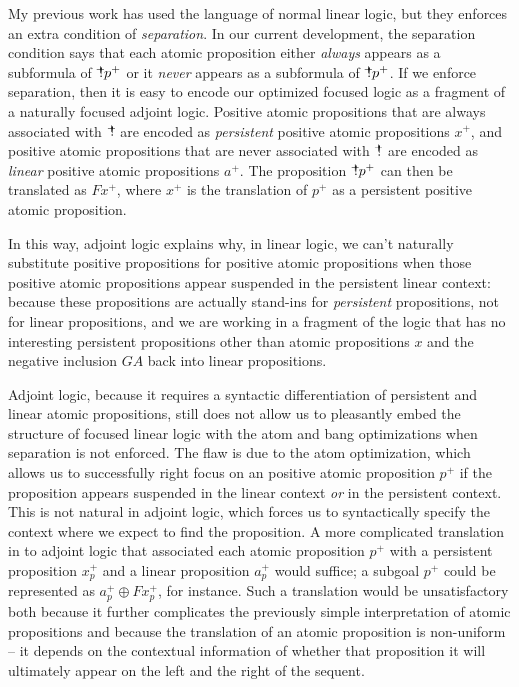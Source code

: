 My previous work has used the language of normal linear logic,
but they enforces an extra condition of {\it separation}. In our
current development, the separation condition says that each atomic
proposition either {\it always} appears as a subformula of
${\mbox{\hspace{2pt}$\mathbb !$\hspace{-5pt}$^+$\hspace{-1pt}}}p^+$ or it {\it never} appears as a subformula of
${\mbox{\hspace{2pt}$\mathbb !$\hspace{-5pt}$^+$\hspace{-1pt}}}p^+$. If we enforce separation, then it is easy to encode our
optimized focused logic as a fragment of a naturally focused adjoint
logic. Positive atomic propositions that are always associated with
${\mbox{\hspace{2pt}$\mathbb !$\hspace{-5pt}$^+$\hspace{-1pt}}}$ are encoded as {\it persistent} positive atomic
propositions $x^+$, and positive atomic propositions that are never
associated with ${\mbox{\hspace{2pt}$\mathbb !$\hspace{-5pt}$^+$\hspace{-1pt}}}$ are encoded as {\it linear} positive atomic
propositions $a^+$. The proposition ${\mbox{\hspace{2pt}$\mathbb !$\hspace{-5pt}$^+$\hspace{-1pt}}}p^+$ can then be
translated as $F x^+$, where $x^+$ is the translation of $p^+$ as a
persistent positive atomic proposition.

In this way, adjoint logic explains why, in linear logic, we can't
naturally substitute positive propositions for positive atomic
propositions when those positive atomic propositions appear suspended
in the persistent linear context: because these propositions are
actually stand-ins for {\it persistent} propositions, not for linear
propositions, and we are working in a fragment of the logic that has
no interesting persistent propositions other than atomic propositions
$x$ and the negative inclusion $G A$ back into linear propositions.

Adjoint logic, because it requires a syntactic differentiation of
persistent and linear atomic propositions, still does not allow us to
pleasantly embed the structure of focused linear logic with the atom
and bang optimizations when separation is not enforced.  The flaw is
due to the atom optimization, which allows us to successfully right
focus on an positive atomic proposition $p^+$ if the proposition
appears suspended in the linear context {\it or} in the persistent
context. This is not natural in adjoint logic, which forces us to
syntactically specify the context where we expect to find the
proposition. A more complicated translation in to adjoint logic that
associated each atomic proposition $p^+$ with a persistent proposition
$x_p^+$ and a linear proposition $a_p^+$ would suffice; a subgoal
$p^+$ could be represented as $a_p^+ \oplus F x_p^+$, for instance.
Such a translation would be unsatisfactory both because it further
complicates the previously simple interpretation of atomic
propositions and because the translation of an atomic proposition is
non-uniform -- it depends on the contextual information of whether
that proposition it will ultimately appear on the left and the right
of the sequent.

